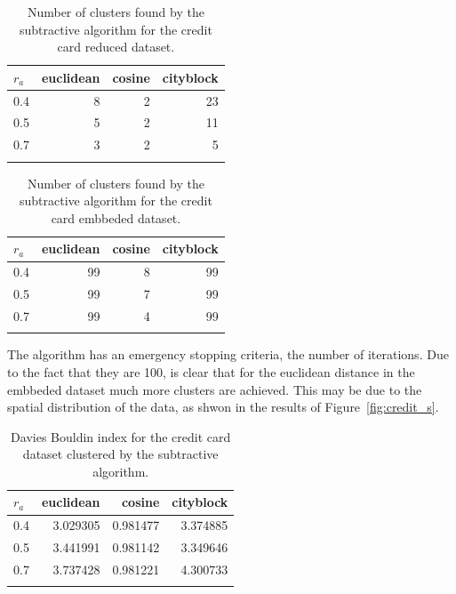 \documentclass[conference]{IEEEtran}
\begin{document}
    \begin{table}[ht!]
        \centering
        \begin{tabular}{lrrr}
        \toprule
        $r_a$ &  euclidean &  cosine &  cityblock \\
        \midrule
        0.4 &          8 &       2 &         23 \\
        0.5 &          5 &       2 &         11 \\
        0.7 &          3 &       2 &          5 \\
        \bottomrule \\
        \end{tabular}
        \caption{Number of clusters found by the subtractive algorithm for the credit card reduced dataset.}
        \label{tab:c2_n_s}
    \end{table}
    
    \begin{table}[ht!]
        \centering
        \begin{tabular}{lrrr}
        \toprule
        $r_a$ &  euclidean &  cosine &  cityblock \\
        \midrule
        0.4 &         99 &       8 &         99 \\
        0.5 &         99 &       7 &         99 \\
        0.7 &         99 &       4 &         99 \\
        \bottomrule \\
        \end{tabular}
        \caption{Number of clusters found by the subtractive algorithm for the credit card embbeded dataset.}
        \label{tab:ce_n_s}
    \end{table}
    
    The algorithm has an emergency stopping criteria, the number of iterations. Due to the fact that they are 100, is clear that for the euclidean distance in the embbeded dataset much more clusters are achieved. This may be due to the spatial distribution of the data, as shwon in the results of Figure~\ref{fig:credit_s}.
    
    \begin{table}[ht!]
        \centering
        \begin{tabular}{lrrr}
        \toprule
        $r_a$ &  euclidean &    cosine &  cityblock \\
        \midrule
        0.4 &   3.029305 &  0.981477 &   3.374885 \\
        0.5 &   3.441991 &  0.981142 &   3.349646 \\
        0.7 &   3.737428 &  0.981221 &   4.300733 \\
        \bottomrule \\
        \end{tabular}
        \caption{Davies Bouldin index for the credit card dataset clustered by the subtractive algorithm.}
        \label{tab:c1_db_s}
    \end{table}
    
\end{document}
